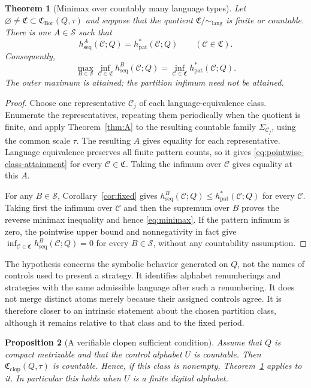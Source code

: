 \documentclass[11pt,reqno]{amsart}
\numberwithin{equation}{section}
\newtheorem{theorem}{Theorem}[section]
\newtheorem{proposition}[theorem]{Proposition}
\theoremstyle{definition}
\newcommand{\C}{\mathcal C}
\newcommand{\hseq}{h_{\mathrm{seq}}}
\newcommand{\hpat}{h_{\mathrm{pat}}^{*}}
\newcommand{\Bor}{\mathrm{Bor}}
\newcommand{\clop}{\mathrm{clop}}
\newcommand{\lang}{\mathrm{lang}}
\begin{document}
\begin{theorem}[Minimax over countably many language types]\label{thm:B}
Let $\varnothing\ne\mathfrak C\subset\mathfrak C_{\Bor}(Q,\tau)$ and suppose
that the quotient $\mathfrak C/{\sim_{\lang}}$ is finite or countable.  There
is one $A\in\mathscr S$ such that
\begin{equation}\label{eq:pointwise-class-attainment}
 \hseq^A(\C;Q)=\hpat(\C;Q)
 \qquad(\C\in\mathfrak C).
\end{equation}
Consequently,
\begin{equation}\label{eq:minimax}
 \max_{B\in\mathscr S}\inf_{\C\in\mathfrak C}
 \hseq^B(\C;Q)
 =\inf_{\C\in\mathfrak C}\hpat(\C;Q).
\end{equation}
The outer maximum is attained; the partition infimum need not be attained.
\end{theorem}

\begin{proof}
Choose one representative $\C_j$ of each language-equivalence class.
Enumerate the representatives, repeating them periodically when the quotient
is finite, and apply Theorem~\ref{thm:A} to the resulting countable family
$\Sigma_{\C_j}$, using the common scale $\tau$.  The resulting $A$ gives equality for each
representative.  Language equivalence preserves all finite pattern counts, so
it gives \eqref{eq:pointwise-class-attainment} for every $\C\in\mathfrak C$.
Taking the infimum over $\C$ gives equality at this $A$.

For any $B\in\mathscr S$, Corollary~\ref{cor:fixed} gives
$\hseq^B(\C;Q)\le\hpat(\C;Q)$ for every $\C$.  Taking first the infimum over
$\C$ and then the supremum over $B$ proves the reverse minimax inequality and
hence \eqref{eq:minimax}.  If the pattern infimum is zero, the pointwise upper
bound and nonnegativity in fact give
$\inf_{\C\in\mathfrak C}\hseq^B(\C;Q)=0$ for every $B\in\mathscr S$, without
any countability assumption.
\end{proof}

The hypothesis concerns the symbolic behavior generated on $Q$, not the
names of controls used to present a strategy.  It identifies alphabet renumberings and strategies with the same
admissible language after such a renumbering. It does not merge distinct
atoms merely because their assigned controls agree.  It is therefore closer to an intrinsic
statement about the chosen partition class, although it remains relative to
that class and to the fixed period.

\begin{proposition}[A verifiable clopen sufficient condition]
\label{prop:digital}
Assume that $Q$ is compact metrizable and that the control alphabet $U$ is
countable.  Then
$\mathfrak C_{\clop}(Q,\tau)$ is countable.  Hence, if this class is nonempty,
Theorem~\ref{thm:B} applies to it.  In particular this holds when $U$ is a
finite digital alphabet.
\end{proposition}
\end{document}
